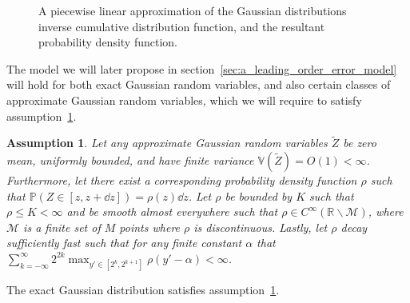 \documentclass[manuscript,review]{acmart}
\newtheorem{assumption}{Assumption}[section]
\begin{document}
\begin{figure}[htb]
\centering
{}
\caption{A piecewise linear approximation of the Gaussian distributions inverse cumulative distribution function, and the resultant probability density function.}
\label{fig:piecewise_linear_approximation}
\end{figure}

The model we will later propose in section~\ref{sec:a_leading_order_error_model} will hold for both exact Gaussian random variables, and also certain classes of approximate Gaussian random variables, which we will require to satisfy assumption~\ref{asmp:approximate_random_variables}.


\begin{assumption}
\label{asmp:approximate_random_variables}
Let any approximate Gaussian random variables $ \widetilde{Z} $ be zero mean, uniformly bounded, and have finite variance $ \mathbb{V}(\widetilde{Z}) = O(1) < \infty  $. Furthermore, let there exist a corresponding probability density function $ \rho $ such that $ \mathbb{P}(Z \in [z, z + \dd{z}]) = \rho(z) \dd{z}$.  Let $ \rho $ be bounded by $ K $ such that $ \rho \leq K < \infty $ and be smooth almost everywhere such that $ \rho \in C^\infty(\mathbb{R}\backslash\mathcal{M})$, where $ \mathcal{M} $ is a finite set of $ M $ points where $ \rho $ is discontinuous. Lastly, let $ \rho $ decay sufficiently fast such that for any finite constant $ \alpha $ that $ \sum_{k=-\infty}^\infty 2^{2k} \max_{y'\in[2^{k}, 2^{k+1}]} \rho(y'-\alpha) < \infty $.
\end{assumption}

\begin{lemma}
\label{lemma:exact_gaussian_distribution}
The exact Gaussian distribution satisfies assumption~\ref{asmp:approximate_random_variables}.
\end{lemma}
\end{document}

